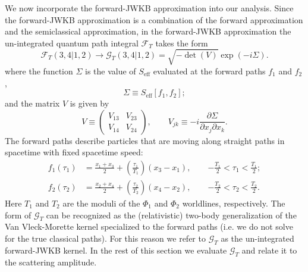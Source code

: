 We now incorporate the forward-JWKB approximation into our analysis. Since the forward-JWKB approximation is a combination of the forward approximation and the semiclassical approximation, in the forward-JWKB approximation the un-integrated quantum path integral $\mathcal{F}_{T}$ takes the form
\begin{equation}
	\mathcal{F}_{T}(3, 4|1, 2) \longrightarrow \mathcal{G}_{T}(3, 4|1, 2) = \sqrt{-\det{(V)}} \exp{\left( -i \Sigma \right)}.
\end{equation}
where the function $\Sigma$ is the value of $S_{\text{eff}}$ evaluated at the forward paths $f_{1}$ and $f_{2}$,
\begin{equation}
	\Sigma \equiv S_{\text{eff}} [f_{1}, f_{2}];
\end{equation}
and the matrix $V$ is given by
\begin{equation}
	V \equiv \begin{pmatrix}
	V_{1 3} & V_{2 3} \\
	V_{1 4} & V_{2 4}
	\end{pmatrix}, \qquad V_{jk} \equiv - i \frac{\partial \Sigma}{\partial x_{j} \partial x_{k}}.
\end{equation}
The forward paths describe particles that are moving along straight paths in spacetime with fixed spacetime speed:
\begin{equation}
\begin{split}
	f_{1}(\tau_{1}) &= \frac{x_{1} + x_{3}}{2} + \left( \frac{\tau_{1}}{T_{1}} \right) \left(x_{3} - x_{1} \right), \qquad { - \frac{T_{1}}{2} } < \tau_{1} < \frac{T_{1}}{2}; \\
	f_{2}(\tau_{2}) &= \frac{x_{2} + x_{4}}{2} + \left( \frac{\tau_{2}}{T_{2}} \right) \left(x_{4} - x_{2} \right), \qquad { - \frac{T_{2}}{2} } < \tau_{2} < \frac{T_{2}}{2}.
\end{split}
\label{fpaths}
\end{equation}
Here $T_{1}$ and $T_{2}$ are the moduli of the $\Phi_{1}$ and $\Phi_{2}$ worldlines, respectively. The form of $\mathcal{G}_{T}$ can be recognized as the (relativistic) two-body generalization of the Van Vleck-Morette kernel \cite{VanVleck,CartierMorette} specialized to the forward paths (i.e. we do not solve for the true classical paths). For this reason we refer to $\mathcal{G}_{T}$ as the un-integrated forward-JWKB kernel. In the rest of this section we evaluate $\mathcal{G}_{T}$ and relate it to the scattering amplitude.
